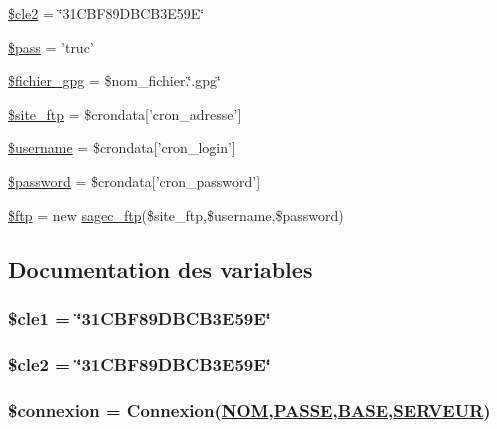 \begin{CompactItemize}
$$\item 
\hyperlink{create__xml_8php_a13}{\$cle2} = \char`\"{}31CBF89DBCB3E59E\char`\"{}
\item 
\hyperlink{create__xml_8php_a14}{\$pass} = 'truc'
\item 
\hyperlink{create__xml_8php_a15}{\$fichier\_\-gpg} = \$nom\_\-fichier.\char`\"{}.gpg\char`\"{}
\item 
\hyperlink{create__xml_8php_a16}{\$site\_\-ftp} = \$crondata\mbox{[}'cron\_\-adresse'\mbox{]}
\item 
\hyperlink{create__xml_8php_a17}{\$username} = \$crondata\mbox{[}'cron\_\-login'\mbox{]}
\item 
\hyperlink{create__xml_8php_a18}{\$password} = \$crondata\mbox{[}'cron\_\-password'\mbox{]}
\item 
\hyperlink{create__xml_8php_a19}{\$ftp} = new \hyperlink{classsagec__ftp}{sagec\_\-ftp}(\$site\_\-ftp,\$username,\$password)
\end{CompactItemize}


\subsection{Documentation des variables}
\hypertarget{create__xml_8php_a12}{
\subsubsection[\$cle1]{\setlength{\rightskip}{0pt plus 5cm}\$cle1 = \char`\"{}31CBF89DBCB3E59E\char`\"{}}}
\label{create__xml_8php_a12}


\hypertarget{create__xml_8php_a13}{
\subsubsection[\$cle2]{\setlength{\rightskip}{0pt plus 5cm}\$cle2 = \char`\"{}31CBF89DBCB3E59E\char`\"{}}}
\label{create__xml_8php_a13}


\hypertarget{create__xml_8php_a0}{
\subsubsection[\$connexion]{\setlength{\rightskip}{0pt plus 5cm}\$connexion = Connexion(\hyperlink{pma__connect_8php_a0}{NOM},\hyperlink{pma__connect_8php_a1}{PASSE},\hyperlink{pma__connect_8php_a3}{BASE},\hyperlink{pma__connect_8php_a2}{SERVEUR})}}
\label{create__xml_8php_a0}



